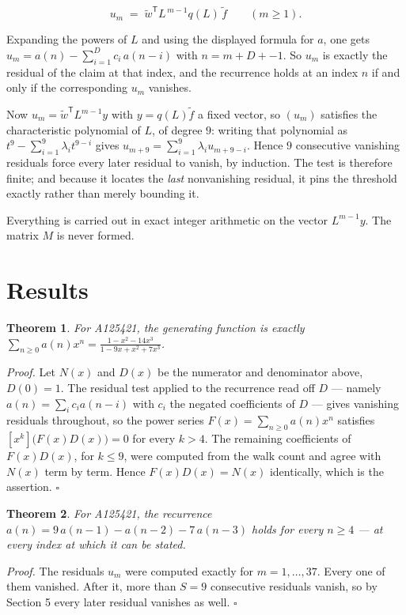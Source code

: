 \documentclass[11pt]{article}
\newtheorem{theorem}{Theorem}
\theoremstyle{definition}
\begin{document}
\[u_m \;=\; \tilde w^{\mathsf T} L^{\,m-1} q(L)\,\tilde f \qquad (m \ge 1).\]

Expanding the powers of $L$ and using the displayed formula for $a$, one gets $u_m = a(n) - \sum_{i=1}^{D} c_i\,a(n-i)$ with $n = m + D + -1$. So $u_m$ is exactly the residual of the claim at that index, and the recurrence holds at an index $n$ if and only if the corresponding $u_m$ vanishes.

Now $u_m = \tilde w^{\mathsf T} L^{m-1} y$ with $y = q(L)\tilde f$ a fixed vector, so $(u_m)$ satisfies the characteristic polynomial of $L$, of degree $9$: writing that polynomial as $t^{9} - \sum_{i=1}^{9} \lambda_i t^{9-i}$ gives $u_{m+9} = \sum_{i=1}^{9} \lambda_i u_{m+9-i}$. Hence $9$ consecutive vanishing residuals force every later residual to vanish, by induction. The test is therefore finite; and because it locates the {\itshape last} nonvanishing residual, it pins the threshold exactly rather than merely bounding it.

Everything is carried out in exact integer arithmetic on the vector $L^{m-1}y$. The matrix $M$ is never formed.

\section{Results}

\begin{theorem} For A125421, the generating function is exactly $\sum_{n\ge 0} a(n)x^n = \frac{1 - x^{2} - 14x^{3}}{1 - 9x + x^{2} + 7x^{3}}$.\end{theorem}

{\itshape Proof.} Let $N(x)$ and $D(x)$ be the numerator and denominator above, $D(0)=1$. The residual test applied to the recurrence read off $D$ --- namely $a(n) = \sum_i c_i a(n-i)$ with $c_i$ the negated coefficients of $D$ --- gives vanishing residuals throughout, so the power series $F(x)=\sum_{n\ge 0}a(n)x^n$ satisfies $[x^k]\bigl(F(x)D(x)\bigr) = 0$ for every $k > 4$. The remaining coefficients of $F(x)D(x)$, for $k \le 9$, were computed from the walk count and agree with $N(x)$ term by term. Hence $F(x)D(x) = N(x)$ identically, which is the assertion. $\square$

\begin{theorem} For A125421, the recurrence $a(n) = 9\,a(n-1) - a(n-2) - 7\,a(n-3)$ holds for every $n \ge 4$ --- at every index at which it can be stated.\end{theorem}

{\itshape Proof.} The residuals $u_m$ were computed exactly for $m = 1,\dots,37$. Every one of them vanished. After it, more than $S = 9$ consecutive residuals vanish, so by Section 5 every later residual vanishes as well. $\square$
\end{document}
